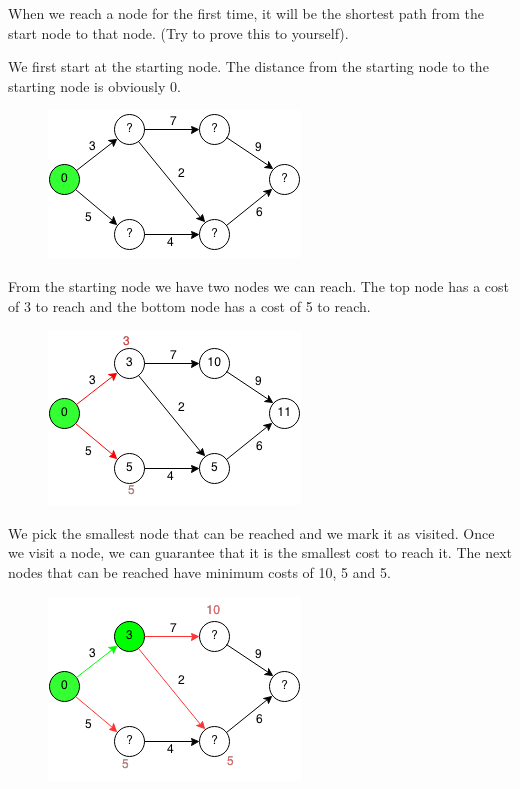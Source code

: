 \documentclass[11pt,oneside]{book}
\makeatletter
\def\maxwidth#1{\ifdim\Gin@nat@width>#1 #1\else\Gin@nat@width\fi}
\makeatother
\begin{document}
When we reach a node for the first time, it will be the shortest path from the start node to that node. (Try to prove this to yourself).

We first start at the starting node. The distance from the starting node to the starting node is obviously 0.

\vspace{5px}\begin{figure}[H]\centering
        \includegraphics[width=0.66\maxwidth{\textwidth}]{djikstra.png}
        \end{figure}

From the starting node we have two nodes we can reach. The top node has a cost of 3 to reach and the bottom node has a cost of 5 to reach.

\vspace{5px}\begin{figure}[H]\centering
        \includegraphics[width=0.66\maxwidth{\textwidth}]{djikstra1.png}
        \end{figure}

We pick the smallest node that can be reached and we mark it as visited. Once we visit a node, we can guarantee that it is the smallest cost to reach it. The next nodes that can be reached have minimum costs of 10, 5 and 5.

\vspace{5px}\begin{figure}[H]\centering
        \includegraphics[width=0.66\maxwidth{\textwidth}]{djikstra2.png}
        \end{figure}
\end{document}
